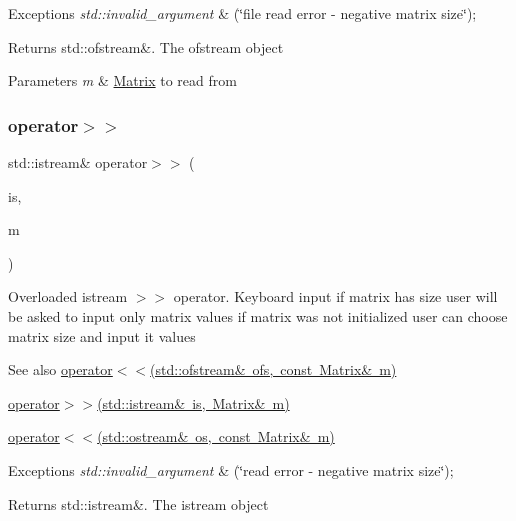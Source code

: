 \begin{DoxyExceptions}{Exceptions}
{\em std\+::invalid\+\_\+argument} & (\char`\"{}file read error -\/ negative matrix size\char`\"{}); \\
\hline
\end{DoxyExceptions}
\begin{DoxyReturn}{Returns}
std\+::ofstream\&. The ofstream object 
\end{DoxyReturn}

\begin{DoxyParams}{Parameters}
{\em m} & \mbox{\hyperlink{class_matrix}{Matrix}} to read from \\
\hline
\end{DoxyParams}
\mbox{\label{class_matrix_a3d6c1dcfc038804f4c08687f4f37f48b}} 
\subsubsection{\texorpdfstring{operator$>$$>$}{operator>>}\hspace{0.1cm}{\footnotesize\ttfamily [1/2]}}
{\footnotesize\ttfamily std\+::istream\& operator$>$$>$ (\begin{DoxyParamCaption}\item[{std\+::istream \&}]{is,  }\item[{\mbox{\hyperlink{class_matrix}{Matrix}} \&}]{m }\end{DoxyParamCaption})\hspace{0.3cm}{\ttfamily [friend]}}

Overloaded istream $>$$>$ operator. Keyboard input if matrix has size user will be asked to input only matrix values if matrix was not initialized user can choose matrix size and input it values \begin{DoxySeeAlso}{See also}
\mbox{\hyperlink{class_matrix_aa574249d63b390cf1108d6e82047ef61}{operator$<$$<$(std\+::ofstream\& ofs, const Matrix\& m)}} 

\mbox{\hyperlink{class_matrix_a3d6c1dcfc038804f4c08687f4f37f48b}{operator$>$$>$(std\+::istream\& is, Matrix\& m)}} 

\mbox{\hyperlink{class_matrix_a060711074cb5bcaf4e75498bc040c4b7}{operator$<$$<$(std\+::ostream\& os, const Matrix\& m)}} 
\end{DoxySeeAlso}

\begin{DoxyExceptions}{Exceptions}
{\em std\+::invalid\+\_\+argument} & (\char`\"{}read error -\/ negative matrix size\char`\"{}); \\
\hline
\end{DoxyExceptions}
\begin{DoxyReturn}{Returns}
std\+::istream\&. The istream object 
\end{DoxyReturn}

